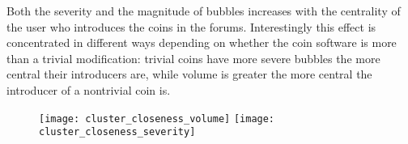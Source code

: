 Both the severity and the magnitude of bubbles increases with the centrality of the user who introduces the coins in the forums.  
Interestingly this effect is concentrated in different ways depending on whether the coin software is more than a trivial modification: trivial coins have more severe bubbles the more central their introducers are, while volume is greater the more central the introducer of a nontrivial coin is.






\begin{figure}[h]
\texttt{[image: cluster\_closeness\_volume]}
\texttt{[image: cluster\_closeness\_severity]}
\end{figure}

